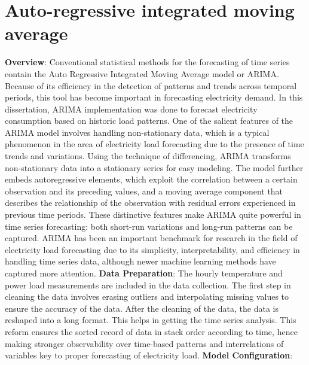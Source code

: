 \documentclass[12pt, a4paper,twoside]{report}
\theoremstyle{plain} %
\theoremstyle{definition} %
\theoremstyle{remark} %
\numberwithin{equation}{chapter}
\begin{document}
\section{Auto-regressive integrated moving average}\label{sec:3.2}
\textbf{Overview}:
\newline
Conventional statistical methods for the forecasting of time series contain the Auto Regressive Integrated Moving Average model or ARIMA. Because of its efficiency in the detection of patterns and trends across temporal periods, this tool has become important in forecasting electricity demand. In this dissertation, ARIMA implementation was done to forecast electricity consumption based on historic load patterns.
One of the salient features of the ARIMA model involves handling non-stationary data, which is a typical phenomenon in the area of electricity load forecasting due to the presence of time trends and variations. Using the technique of differencing, ARIMA transforms non-stationary data into a stationary series for easy modeling. The model further embeds autoregressive elements, which exploit the correlation between a certain observation and its preceding values, and a moving average component that describes the relationship of the observation with residual errors experienced in previous time periods.
These distinctive features make ARIMA quite powerful in time series forecasting: both short-run variations and long-run patterns can be captured. ARIMA has been an important benchmark for research in the field of electricity load forecasting due to its simplicity, interpretability, and efficiency in handling time series data, although newer machine learning methods have captured more attention.
\newline
\textbf{Data Preparation}:
\newline
The hourly temperature and power load measurements are included in the data collection. The first step in cleaning the data involves erasing outliers and interpolating missing values to ensure the accuracy of the data. After the cleaning of the data, the data is reshaped into a long format. This helps in getting the time series analysis. This reform ensures the sorted record of data in stack order according to time, hence making stronger observability over time-based patterns and interrelations of variables key to proper forecasting of electricity load.
\newline
\textbf{Model Configuration}:
\newline
\end{document}
